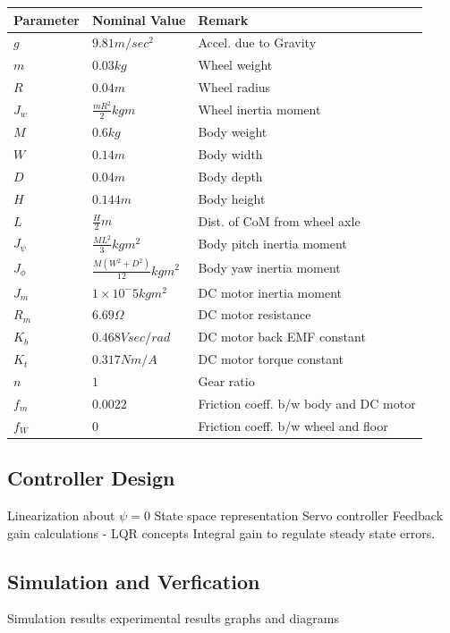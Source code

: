 \documentclass[paper=a4, fontsize=11pt]{scrartcl}
\numberwithin{equation}{section}        %
\numberwithin{figure}{section}          %
\numberwithin{table}{section}           %
\begin{document}
\begin{tabular}{|l|l|l|}
\hline
Parameter & Nominal Value & Remark \\
\hline
$g$ & $9.81 m/sec^2$ & Accel. due to Gravity \\
\hline
$m$ & $0.03 kg$ & Wheel weight \\
\hline
$R$ & $0.04 m$ & Wheel radius \\
\hline
$J_{w}$ & $\frac{mR^2}{2} kgm$ & Wheel inertia moment \\
\hline
$M$ & $0.6 kg$ & Body weight \\
\hline
$W$ & $0.14 m$ & Body width \\
\hline
$D$ & $0.04 m$ & Body depth \\
\hline
$H$ & $0.144 m$ & Body height \\
\hline
$L$ & $\frac{H}{2} m$  & Dist. of CoM from wheel axle \\
\hline
$J_{\psi}$ & $\frac{ML^2}{3} kgm^2$ & Body pitch inertia moment \\
\hline
$J_{\phi}$ & $\frac{M(W^2+D^2)}{12} kgm^2$ & Body yaw inertia moment \\
\hline
$J_m$ & $1×10^−5 kgm^2$ & DC motor inertia moment \\
\hline
$R_m$ & $6.69 \Omega$ & DC motor resistance \\
\hline
$K_b$ & $0.468 Vsec/rad$ & DC motor back EMF constant \\
\hline
$K_t$ & $0.317 Nm/A$ & DC motor torque constant \\
\hline
$n$ & $1$ & Gear ratio \\
\hline
$f_m$ & $0.0022$ & Friction coeff. b/w body and DC motor \\
\hline
$f_W$ & $0$ & Friction coeff. b/w wheel and floor \\
\hline
\end{tabular}

\subsection{Controller Design}
Linearization about $\psi = 0$
State space representation 
Servo controller
Feedback gain calculations - LQR concepts
Integral gain to regulate steady state errors.

\subsection{Simulation and Verfication}
Simulation results
experimental results
graphs and diagrams
\end{document}

